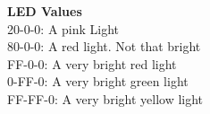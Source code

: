 \documentclass[11pt]{article}
\theoremstyle{plain}
\theoremstyle{definition}
\begin{document}
\textbf{LED Values}\\
20-0-0: A pink Light\\
80-0-0: A red light. Not that bright\\
FF-0-0: A very bright red light\\
0-FF-0: A very bright green light\\
FF-FF-0: A very bright yellow light
\end{document}
